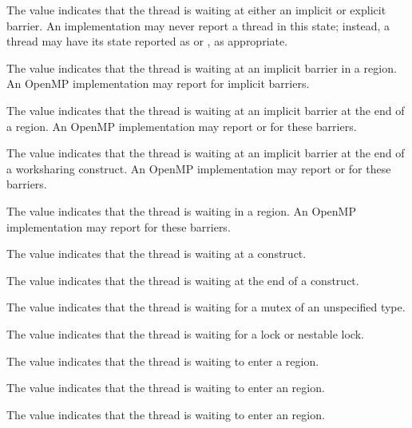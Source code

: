 The value  indicates that the thread is 
waiting at either an implicit or explicit barrier. An implementation 
may never report a thread in this state; instead, a thread may have its 
state reported as   or 
, as appropriate.

The value  indicates that the 
thread is waiting at an implicit barrier in a  region. An 
OpenMP implementation may report  for 
implicit barriers.

The value  indicates 
that the thread is waiting at an implicit barrier at the end of a  
region. An OpenMP implementation may report  
or  for these barriers.

The value   indicates 
that the thread is waiting at an implicit barrier at the end of a 
worksharing construct. An OpenMP implementation may report 
 or  
for these barriers.

The value  indicates that the 
thread is waiting in a  region. An OpenMP implementation
may report  for these barriers.

The value  indicates that the thread is 
waiting at a  construct. 

The value  indicates that the thread is 
waiting at the end of a  construct. 

The value  indicates that the thread is waiting 
for a mutex of an unspecified type. 

The value  indicates that the thread is waiting 
for a  lock or nestable lock. 

The value  indicates that the thread is 
waiting to enter a  region. 

The value  indicates that the thread is 
waiting to enter an  region. 

The value  indicates that the thread is 
waiting to enter an  region. 

